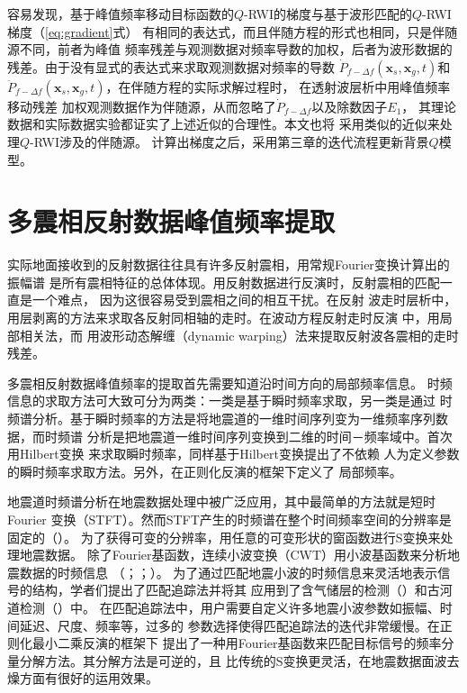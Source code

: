 容易发现，基于峰值频率移动目标函数的$Q$-RWI的梯度与基于波形匹配的$Q$-RWI梯度（\ref{eq:gradient}式）
有相同的表达式，而且伴随方程的形式也相同，只是伴随源不同，前者为峰值
频率残差与观测数据对频率导数的加权，后者为波形数据的残差。由于没有显式的表达式来求取观测数据对频率的导数
$\dot{P}_{f-\Delta f}(\mathbf{x}_s,\mathbf{x}_g,t)$和$\ddot{P}_{f-\Delta f}(\mathbf{x}_s,
\mathbf{x}_g,t)$，在伴随方程的实际求解过程时，
在透射波层析中用峰值频率移动残差
加权观测数据作为伴随源，从而忽略了$\dot{P}_{f-\Delta f}$以及除数因子$E_1$，
其理论数据和实际数据实验都证实了上述近似的合理性。本文也将
采用类似的近似来处理$Q$-RWI涉及的伴随源。
计算出梯度之后，采用第三章的迭代流程更新背景$Q$模型。


\vspace{0.5cm}
\section{多震相反射数据峰值频率提取}
\vspace{0.5cm}
实际地面接收到的反射数据往往具有许多反射震相，用常规Fourier变换计算出的振幅谱
是所有震相特征的总体体现。用反射数据进行反演时，反射震相的匹配一直是一个难点，
因为这很容易受到震相之间的相互干扰。在反射
波走时层析中，用层剥离的方法来求取各反射同相轴的走时。在波动方程反射走时反演
中，用局部相关法，而
用波形动态解缠（dynamic warping）法来提取反射波各震相的走时残差。

多震相反射数据峰值频率的提取首先需要知道沿时间方向的局部频率信息。
时频信息的求取方法可大致可分为两类：一类是基于瞬时频率求取，另一类是通过
时频谱分析。基于瞬时频率的方法是将地震道的一维时间序列变为一维频率序列数据，而时频谱
分析是把地震道一维时间序列变换到二维的时间－频率域中。首次用Hilbert变换
来求取瞬时频率，同样基于Hilbert变换提出了不依赖
人为定义参数的瞬时频率求取方法。另外，在正则化反演的框架下定义了
局部频率。

地震道时频谱分析在地震数据处理中被广泛应用，其中最简单的方法就是短时Fourier
变换（STFT）。然而STFT产生的时频谱在整个时间频率空间的分辨率是固定的（）。
为了获得可变的分辨率，用任意的可变形状的窗函数进行S变换来处理地震数据。
除了Fourier基函数，连续小波变换（CWT）用小波基函数来分析地震数据的时频信息
（；；）。
为了通过匹配地震小波的时频信息来灵活地表示信号的结构，学者们提出了匹配追踪法并将其
应用到了含气储层的检测（）和古河道检测（）中。
在匹配追踪法中，用户需要自定义许多地震小波参数如振幅、时间延迟、尺度、频率等，过多的
参数选择使得匹配追踪法的迭代非常缓慢。在正则化最小二乘反演的框架下
提出了一种用Fourier基函数来匹配目标信号的频率分量分解方法。其分解方法是可逆的，且
比传统的S变换更灵活，在地震数据面波去燥方面有很好的运用效果。


